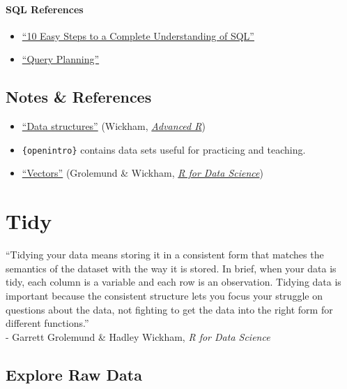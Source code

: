\documentclass[
]{book}
\providecommand{\tightlist}{%
  \setlength{\itemsep}{0pt}\setlength{\parskip}{0pt}}
\begin{document}
\hypertarget{sql-references}{%
\subsubsection{SQL References}\label{sql-references}}

\begin{itemize}
\tightlist
\item
  \href{https://blog.jooq.org/2016/03/17/10-easy-steps-to-a-complete-understanding-of-sql/}{``10 Easy Steps to a Complete Understanding of SQL''}
\item
  \href{https://www.sqlite.org/queryplanner.html}{``Query Planning''}
\end{itemize}

\hypertarget{notes-references}{%
\section{Notes \& References}\label{notes-references}}

\begin{itemize}
\tightlist
\item
  \href{http://adv-r.had.co.nz/Data-structures.html}{``Data structures''} (Wickham, \href{http://adv-r.had.co.nz/}{\emph{Advanced R}})
\item
  \texttt{\{openintro\}} contains data sets useful for practicing and teaching.
\item
  \href{https://r4ds.had.co.nz/vectors.html}{``Vectors''} (Grolemund \& Wickham, \href{https://r4ds.had.co.nz/}{\emph{R for Data Science}})
\end{itemize}

\hypertarget{tidy}{%
\chapter{Tidy}\label{tidy}}

``Tidying your data means storing it in a consistent form that matches the semantics of the dataset with the way it is stored. In brief, when your data is tidy, each column is a variable and each row is an observation. Tidying data is important because the consistent structure lets you focus your struggle on questions about the data, not fighting to get the data into the right form for different functions.''\\
- Garrett Grolemund \& Hadley Wickham, \emph{R for Data Science}

\hypertarget{explore-raw-data}{%
\section{Explore Raw Data}\label{explore-raw-data}}
\end{document}
